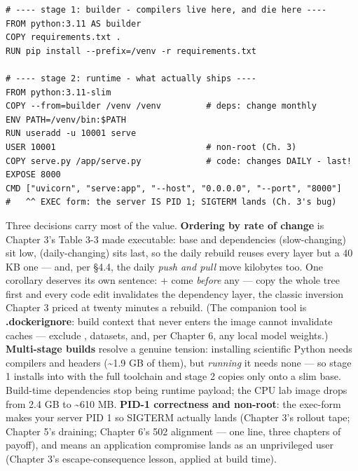 \begin{terminalbox}
\begin{Verbatim}[breaklines=true,breakanywhere=true,fontsize=\small,formatcom=\color{tbbtermfg},codes=\tbbcodeactive]
# ---- stage 1: builder - compilers live here, and die here ----
FROM python:3.11 AS builder
COPY requirements.txt .
RUN pip install --prefix=/venv -r requirements.txt

# ---- stage 2: runtime - what actually ships ----
FROM python:3.11-slim
COPY --from=builder /venv /venv         # deps: change monthly
ENV PATH=/venv/bin:$PATH
RUN useradd -u 10001 serve
USER 10001                              # non-root (Ch. 3)
COPY serve.py /app/serve.py             # code: changes DAILY - last!
EXPOSE 8000
CMD ["uvicorn", "serve:app", "--host", "0.0.0.0", "--port", "8000"]
#   ^^ EXEC form: the server IS PID 1; SIGTERM lands (Ch. 3's bug)
\end{Verbatim}
\end{terminalbox}

Three decisions carry most of the value. \textbf{Ordering by rate of change} is Chapter 3's Table 3-3 made executable: base and dependencies (slow-changing) sit low,  (daily-changing) sits last, so the daily rebuild reuses every layer but a 40 KB one — and, per §4.4, the daily \textit{push and pull} move kilobytes too. One corollary deserves its own sentence:  +  come \textit{before} any  — copy the whole tree first and every code edit invalidates the dependency layer, the classic inversion Chapter 3 priced at twenty minutes a rebuild. (The companion tool is \textbf{.dockerignore}: build context that never enters the image cannot invalidate caches — exclude , datasets, and, per Chapter 6, any local model weights.) \textbf{Multi-stage builds} resolve a genuine tension: installing scientific Python needs compilers and headers (\textasciitilde{}1.9 GB of them), but \textit{running} it needs none — so stage 1 installs into  with the full toolchain and stage 2 copies only  onto a slim base. Build-time dependencies stop being runtime payload; the CPU lab image drops from 2.4 GB to \textasciitilde{}610 MB. \textbf{PID-1 correctness and non-root}: the exec-form  makes your server PID 1 so SIGTERM actually lands (Chapter 3's rollout tape; Chapter 5's draining; Chapter 6's 502 alignment — one line, three chapters of payoff), and  means an application compromise lands as an unprivileged user (Chapter 3's escape-consequence lesson, applied at build time).

